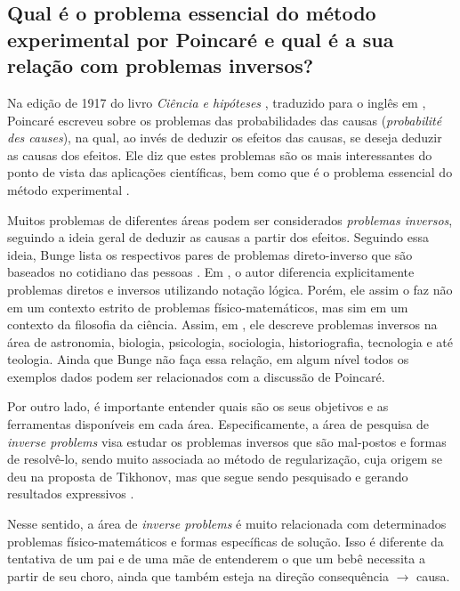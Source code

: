  



\subsection{Qual é o problema essencial do método experimental por Poincaré e qual é a sua relação com problemas inversos?}\label{sec:poincare}

Na edição de 1917 do livro \textit{Ciência e hipóteses} \cite{poincare1917}, traduzido para o inglês em \cite[pág. 131]{poincare2018science}, Poincaré escreveu sobre os problemas das probabilidades das causas (\textit{probabilité des causes}), na qual, ao invés de deduzir os efeitos das causas, se deseja deduzir as causas dos efeitos. Ele diz que estes problemas são os mais interessantes do ponto de vista das aplicações científicas, bem como que é o problema essencial do método experimental \cite[pág. 222]{poincare1917}. 

Muitos problemas de diferentes áreas podem ser considerados \textit{problemas inversos}, seguindo a ideia geral de deduzir as causas a partir dos efeitos. Seguindo essa ideia, Bunge lista os respectivos pares de problemas direto-inverso que são baseados no cotidiano das pessoas \cite[Tabela 2]{Bunge2019}. Em \cite[Seção 3]{Bunge2019}, o autor diferencia explicitamente problemas diretos e inversos utilizando notação lógica. Porém, ele assim o faz não em um contexto estrito de problemas físico-matemáticos, mas sim em um contexto da filosofia da ciência. Assim, em  \cite[Seção 5]{Bunge2019}, ele descreve problemas inversos na área de astronomia, biologia, psicologia, sociologia, historiografia, tecnologia e até teologia. Ainda que Bunge não faça essa relação, em algum nível todos os exemplos dados podem ser relacionados com a discussão de Poincaré. 


Por outro lado, é importante entender quais são os seus objetivos e as ferramentas disponíveis em cada área. Especificamente, a área de pesquisa de \textit{inverse problems} visa estudar os problemas inversos que são mal-postos \cite[pág. 3]{Flemming2018} e formas de resolvê-lo, sendo muito associada ao método de regularização, cuja origem se deu na proposta de Tikhonov, mas que segue sendo pesquisado e gerando resultados expressivos \cite{Benning2018}. 

Nesse sentido, a área de \textit{inverse problems} é muito relacionada com determinados problemas físico-matemáticos e formas específicas de solução. Isso é diferente da tentativa de um pai e de uma mãe de entenderem o que um bebê necessita a partir de seu choro, ainda que também esteja na direção consequência $\rightarrow$ causa. 

